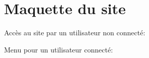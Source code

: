 \documentclass[oneside]{report}
\begin{document}
{		\section{Maquette du site}
		{
			\par Accès au site par un utilisateur non connecté:\\ \vspace{.5cm}
			\noindent{}
			\newpage
			\par Menu pour un utilisateur connecté: \\ \vspace{0.5cm}
			\noindent{}
}}
\end{document}
